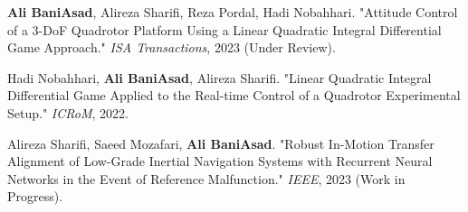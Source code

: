 
\begin{cventries}
	
	\cventry
	{} %
	{} %
	{} %
	{} %
	{
		\vspace{-4mm}
		\begin{cvitemize2}
			\item \textbf{Ali BaniAsad}, Alireza Sharifi, Reza Pordal, Hadi Nobahhari. "Attitude Control of a 3-DoF Quadrotor Platform Using a Linear Quadratic Integral Differential Game Approach." \textit{ISA Transactions}, 2023 (Under Review).
			\vspace{1mm}
			\item Hadi Nobahhari,  \textbf{Ali BaniAsad}, Alireza Sharifi. "Linear Quadratic Integral Differential Game Applied to the Real-time Control of a Quadrotor Experimental Setup." \textit{ICRoM}, 2022.
			\item Alireza Sharifi, Saeed Mozafari, \textbf{Ali BaniAsad}. "Robust In-Motion Transfer Alignment of Low-Grade Inertial Navigation Systems with Recurrent Neural Networks in the Event of Reference Malfunction." \textit{IEEE}, 2023 (Work in Progress).
		\end{cvitemize2}
		\vspace{-4mm}
	}
	
\end{cventries}



